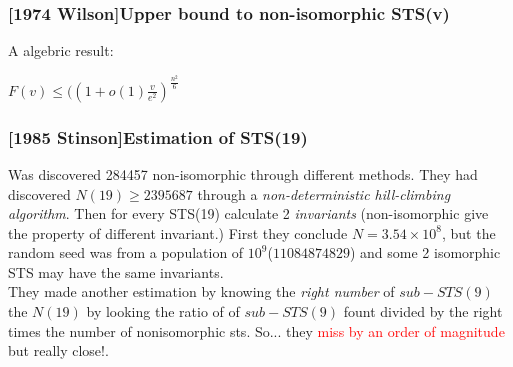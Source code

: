 \begin{frame}
\frametitle{[1974 Wilson]Upper bound to non-isomorphic STS(v)}
A algebric result:
\begin{center}
	\begin{math}
		F(v) \le ((1 + o (1)\frac{v}{e^2})^{\frac{n^2}{6}}
	\end{math}
\end{center}
\end{frame}


\begin{frame}
\frametitle{[1985 Stinson]Estimation of STS(19)}
Was discovered 284457 non-isomorphic through different methods.
They had discovered $N(19) \ge 2395687$  through a \textit{non-deterministic hill-climbing algorithm}. Then for every STS(19) calculate 2 \textit{invariants} (non-isomorphic give the property of different invariant.) First they conclude $N=3.54 \times 10^8$, but the random seed was from a population of $10^9$($11084874829$) and some 2 isomorphic STS may have the same invariants.\\

They made another estimation by knowing the \textit{right number} of $sub-STS(9)$ the $N(19)$ by looking the ratio of of $sub-STS(9)$ fount divided by the right times the number of nonisomorphic sts. So... they \textcolor{red}{miss by an order of magnitude} but really close!.
\end{frame}